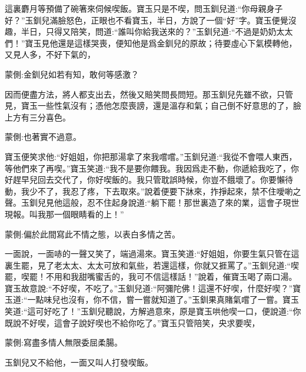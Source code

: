 \begin{parag}
    這裏麝月等預備了碗箸來伺候喫飯。寶玉只是不喫，問玉釧兒道:“你母親身子好？”玉釧兒滿臉怒色，正眼也不看寶玉，半日，方說了一個“好”字。寶玉便覺沒趣，半日，只得又陪笑，問道:“誰叫你給我送來的？”玉釧兒道:“不過是奶奶太太們！”寶玉見他還是這樣哭喪，便知他是爲金釧兒的原故；待要虛心下氣模轉他，又見人多，不好下氣的，\begin{note}蒙側:金釧兒如若有知，敢何等感激？\end{note}因而便盡方法，將人都支出去，然後又賠笑問長問短。那玉釧兒先雖不欲，只管見，寶玉一些性氣沒有；憑他怎麼喪謗，還是溫存和氣；自己倒不好意思的了，臉上方有三分喜色。\begin{note}蒙側:也著實不過意。\end{note}寶玉便笑求他:“好姐姐，你把那湯拿了來我嚐嚐。”玉釧兒道:“我從不會喂人東西，等他們來了再喫。”寶玉笑道:“我不是要你餵我。我因爲走不動，你遞給我吃了，你好趕早兒回去交代了，你好喫飯的。我只管耽誤時候，你豈不餓壞了。你要懶待動，我少不了，我忍了疼，下去取來。”說着便要下牀來，拃掙起來，禁不住噯喲之聲。玉釧兒見他這般，忍不住起身說道:“躺下罷！那世裏造了來的業，這會子現世現報。叫我那一個眼睛看的上！”\begin{note}蒙側:偏於此間寫此不情之態，以表白多情之苦。\end{note}一面說，一面哧的一聲又笑了，端過湯來。寶玉笑道:“好姐姐，你要生氣只管在這裏生罷，見了老太太、太太可放和氣些，若還這樣，你就又捱罵了。”玉釧兒道:“喫罷，喫罷！不用和我甜嘴蜜舌的，我可不信這樣話！”說着，催寶玉喝了兩口湯。寶玉故意說:“不好喫，不吃了。”玉釧兒道:“阿彌陀佛！這還不好喫，什麼好喫？”寶玉道:“一點味兒也沒有，你不信，嘗一嘗就知道了。”玉釧果真賭氣嚐了一嘗。寶玉笑道:“這可好吃了！”玉釧兒聽說，方解過意來，原是寶玉哄他喫一口，便說道:“你既說不好喫，這會子說好喫也不給你吃了。”寶玉只管陪笑，央求要喫，\begin{note}蒙側:寫盡多情人無限委屈柔腸。\end{note}玉釧兒又不給他，一面又叫人打發喫飯。
\end{parag}


